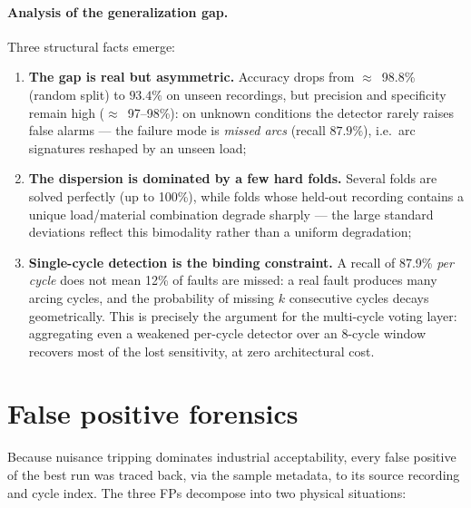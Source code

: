 \paragraph{Analysis of the generalization gap.} Three structural facts emerge:

\begin{enumerate}[itemsep=2pt]
    \item \textbf{The gap is real but asymmetric.} Accuracy drops from $\approx$~98.8\% (random split) to $93.4\%$ on unseen recordings, but precision and specificity remain high ($\approx$~97--98\%): on unknown conditions the detector rarely raises false alarms --- the failure mode is \emph{missed arcs} (recall $87.9\%$), i.e.\ arc signatures reshaped by an unseen load;
    \item \textbf{The dispersion is dominated by a few hard folds.} Several folds are solved perfectly (up to 100\%), while folds whose held-out recording contains a unique load/material combination degrade sharply --- the large standard deviations reflect this bimodality rather than a uniform degradation;
    \item \textbf{Single-cycle detection is the binding constraint.} A recall of 87.9\% \emph{per cycle} does not mean 12\% of faults are missed: a real fault produces many arcing cycles, and the probability of missing $k$ consecutive cycles decays geometrically. This is precisely the argument for the multi-cycle voting layer: aggregating even a weakened per-cycle detector over an 8-cycle window recovers most of the lost sensitivity, at zero architectural cost.
\end{enumerate}

\section{False positive forensics}
\label{sec:fp-forensics}

Because nuisance tripping dominates industrial acceptability, every false positive of the best run was traced back, via the sample metadata, to its source recording and cycle index. The three FPs decompose into two physical situations:

